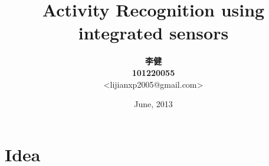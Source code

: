 \documentclass[11pt,slidestop,mathserif,compress]{beamer}
\begin{document}
%

\title{Activity Recognition using integrated sensors}
\author{{\bfseries 李健} \\ {\bfseries 101220055} \\ {\scriptsize <lijianxp2005@gmail.com>}}
\subject{Computer Science}
\date{June, 2013}



\begin{frame}[plain]
	\titlepage
\end{frame}


\section{Idea}
\end{document}
